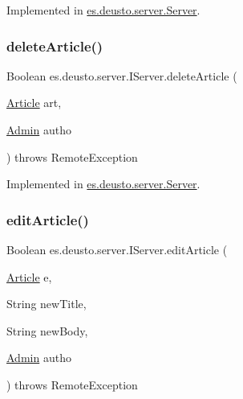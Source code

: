 Implemented in \hyperlink{classes_1_1deusto_1_1server_1_1_server_a58363d9c2c5c5d1e085e22deeeebf833}{es.\+deusto.\+server.\+Server}.

\mbox{\label{interfacees_1_1deusto_1_1server_1_1_i_server_ac96e072eb8a660ebcd5e535cb1324e64}} 
\subsubsection{\texorpdfstring{delete\+Article()}{deleteArticle()}}
{\footnotesize\ttfamily Boolean es.\+deusto.\+server.\+I\+Server.\+delete\+Article (\begin{DoxyParamCaption}\item[{\hyperlink{classes_1_1deusto_1_1server_1_1jdo_1_1_article}{Article}}]{art,  }\item[{\hyperlink{classes_1_1deusto_1_1server_1_1jdo_1_1_admin}{Admin}}]{autho }\end{DoxyParamCaption}) throws Remote\+Exception}



Implemented in \hyperlink{classes_1_1deusto_1_1server_1_1_server_ad9d8810833b631866924dc481801614a}{es.\+deusto.\+server.\+Server}.

\mbox{\label{interfacees_1_1deusto_1_1server_1_1_i_server_ab5c4258f62146d90a064604891cedf2f}} 
\subsubsection{\texorpdfstring{edit\+Article()}{editArticle()}}
{\footnotesize\ttfamily Boolean es.\+deusto.\+server.\+I\+Server.\+edit\+Article (\begin{DoxyParamCaption}\item[{\hyperlink{classes_1_1deusto_1_1server_1_1jdo_1_1_article}{Article}}]{e,  }\item[{String}]{new\+Title,  }\item[{String}]{new\+Body,  }\item[{\hyperlink{classes_1_1deusto_1_1server_1_1jdo_1_1_admin}{Admin}}]{autho }\end{DoxyParamCaption}) throws Remote\+Exception}



